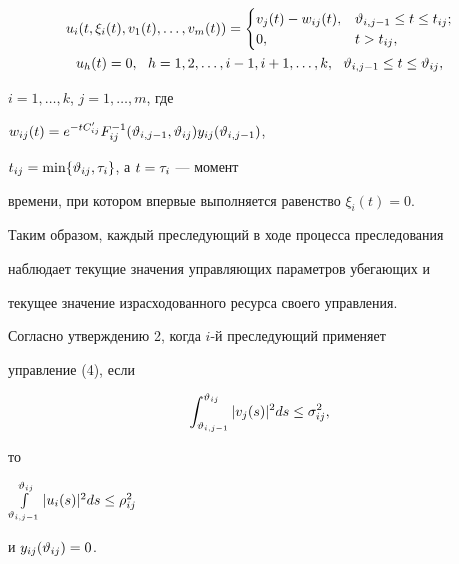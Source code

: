 \begin{gather}


u_i(t, \xi_i(t), v_1(t), \dotsc, v_m(t)) = 


\begin{cases}


v_j(t) - w_{ij}(t), & \v_{i,j-1} \leq t \leq t_{ij}; \\


0, & t > t_{ij},


\end{cases}


\\


u_h(t) = 0, \ \ h =1,2, \dotsc, i - 1,i+1, \dotsc, k,


\ \ \v_{i,j-1} \leq t \leq \v_{ij},\notag


\end{gather}


$i = 1,\dotsc,k$, $j = 1,\dotsc,m$, где


$w_{ij}(t) = e^{-tC_{ij}'}F_{ij}^{-1}(\v_{i,j-1},


\v_{ij})y_{ij}(\v_{i,j-1})$,


$t_{ij} = \min\{\vartheta_{ij}, \tau_{i} \}$, а $t = \tau_{i}$ --- момент


времени, при котором впервые выполняется равенство $\xi_{i}(t)= 0$.





Таким образом, каждый преследующий в ходе процесса преследования


наблюдает текущие значения управляющих параметров убегающих и


текущее значение израсходованного ресурса своего управления.





Согласно утверждению 2, когда $i$-й преследующий применяет


управление (4), если


\begin{equation}


\int_{\v_{i,j-1}}^{\v_{ij}}|v_j(s)|^2ds \leq \s_{ij}^2,


\end{equation}


то


$\int\limits_{\vartheta_{i,j-1}}^{\vartheta_{ij}}|u_i(s)|^2ds \leq \rho_{ij}^2$


и $y_{ij}(\vartheta_{ij}) = 0$.





